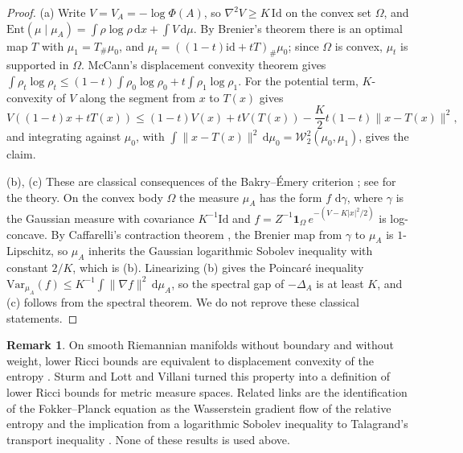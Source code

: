 \documentclass[11pt,a4paper,reqno]{amsart}
\theoremstyle{definition}
\newtheorem{remark}[theorem]{Remark}
\numberwithin{equation}{section}
\newcommand{\Id}{\mathrm{Id}}
\newcommand{\dif}{\,\mathrm{d}}
\begin{document}
\begin{proof}
(a) Write $V = V_A = -\log \Phi(A)$, so $\nabla^2 V \ge K\,\Id$ on the convex set $\Omega$, and $\mathrm{Ent}(\mu \mid \mu_A) = \int \rho \log \rho \dif x + \int V \dif \mu$. By Brenier's theorem \cite{brenier1991polar} there is an optimal map $T$ with $\mu_1 = T_\#\mu_0$, and $\mu_t = ((1-t)\mathrm{id} + tT)_\# \mu_0$; since $\Omega$ is convex, $\mu_t$ is supported in $\Omega$. McCann's displacement convexity theorem \cite{mccann1997convexity} gives $\int \rho_t \log \rho_t \le (1-t)\int \rho_0\log\rho_0 + t \int\rho_1\log\rho_1$. For the potential term, $K$-convexity of $V$ along the segment from $x$ to $T(x)$ gives
\begin{equation}
    V((1-t)x + tT(x)) \le (1-t)V(x) + tV(T(x)) - \frac{K}{2}t(1-t)\|x - T(x)\|^2,
\end{equation}
and integrating against $\mu_0$, with $\int \|x - T(x)\|^2 \dif\mu_0 = \mathcal{W}_2^2(\mu_0,\mu_1)$, gives the claim.

(b), (c) These are classical consequences of the Bakry--\'Emery criterion \cite{bakry1985diffusions}; see \cite{bakry2014analysis} for the theory. On the convex body $\Omega$ the measure $\mu_A$ has the form $f\,\dif\gamma$, where $\gamma$ is the Gaussian measure with covariance $K^{-1}\Id$ and $f = Z^{-1}\mathbf{1}_\Omega\, e^{-(V - K|x|^2/2)}$ is log-concave. By Caffarelli's contraction theorem \cite{caffarelli2000monotonicity}, the Brenier map from $\gamma$ to $\mu_A$ is $1$-Lipschitz, so $\mu_A$ inherits the Gaussian logarithmic Sobolev inequality with constant $2/K$, which is (b). Linearizing (b) gives the Poincar\'e inequality $\mathrm{Var}_{\mu_A}(f) \le K^{-1}\int\|\nabla f\|^2\dif\mu_A$, so the spectral gap of $-\Delta_A$ is at least $K$, and (c) follows from the spectral theorem. We do not reprove these classical statements.
\end{proof}

\begin{remark}
On smooth Riemannian manifolds without boundary and without weight, lower Ricci bounds are equivalent to displacement convexity of the entropy \cite{von2005transport}. Sturm \cite{sturm2006geometryI,sturm2006geometryII} and Lott and Villani \cite{lott2009ricci} turned this property into a definition of lower Ricci bounds for metric measure spaces. Related links are the identification of the Fokker--Planck equation as the Wasserstein gradient flow of the relative entropy \cite{jordan1998variational} and the implication from a logarithmic Sobolev inequality to Talagrand's transport inequality \cite{otto2000generalization}. None of these results is used above.
\end{remark}
\end{document}
